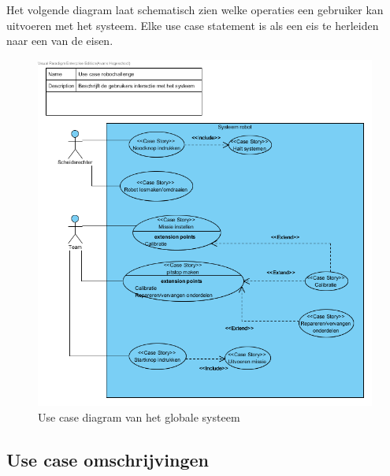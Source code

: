 \documentclass[12pt]{article} %
\begin{document}
Het volgende diagram laat schematisch zien welke operaties een gebruiker kan uitvoeren met het systeem. Elke use case statement is als een eis te herleiden naar een van de eisen.
\begin{center}
\begin{figure}
\includegraphics[scale=.9]{usecase.png}
\caption{Use case diagram van het globale systeem}
\label{fig:usecase}
\end{figure}
\end{center}
\clearpage
\newpage

\subsection{Use case omschrijvingen}
\end{document}
